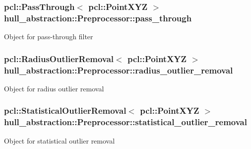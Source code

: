 \subsubsection[{\texorpdfstring{pass\+\_\+through}{pass_through}}]{\setlength{\rightskip}{0pt plus 5cm}pcl\+::\+Pass\+Through$<$ pcl\+::\+Point\+X\+YZ $>$ hull\+\_\+abstraction\+::\+Preprocessor\+::pass\+\_\+through\hspace{0.3cm}{\ttfamily [private]}}\hypertarget{classhull__abstraction_1_1_preprocessor_a9396fe58d584ed1e7468f694f2458734}{}\label{classhull__abstraction_1_1_preprocessor_a9396fe58d584ed1e7468f694f2458734}
Object for pass-\/through filter 
\subsubsection[{\texorpdfstring{radius\+\_\+outlier\+\_\+removal}{radius_outlier_removal}}]{\setlength{\rightskip}{0pt plus 5cm}pcl\+::\+Radius\+Outlier\+Removal$<$ pcl\+::\+Point\+X\+YZ $>$ hull\+\_\+abstraction\+::\+Preprocessor\+::radius\+\_\+outlier\+\_\+removal\hspace{0.3cm}{\ttfamily [private]}}\hypertarget{classhull__abstraction_1_1_preprocessor_af0a5e8dd7c130abe702230dd59529360}{}\label{classhull__abstraction_1_1_preprocessor_af0a5e8dd7c130abe702230dd59529360}
Object for radius outlier removal 
\subsubsection[{\texorpdfstring{statistical\+\_\+outlier\+\_\+removal}{statistical_outlier_removal}}]{\setlength{\rightskip}{0pt plus 5cm}pcl\+::\+Statistical\+Outlier\+Removal$<$ pcl\+::\+Point\+X\+YZ $>$ hull\+\_\+abstraction\+::\+Preprocessor\+::statistical\+\_\+outlier\+\_\+removal\hspace{0.3cm}{\ttfamily [private]}}\hypertarget{classhull__abstraction_1_1_preprocessor_af9b4760942460988811e9989da18633f}{}\label{classhull__abstraction_1_1_preprocessor_af9b4760942460988811e9989da18633f}
Object for statistical outlier removal 

